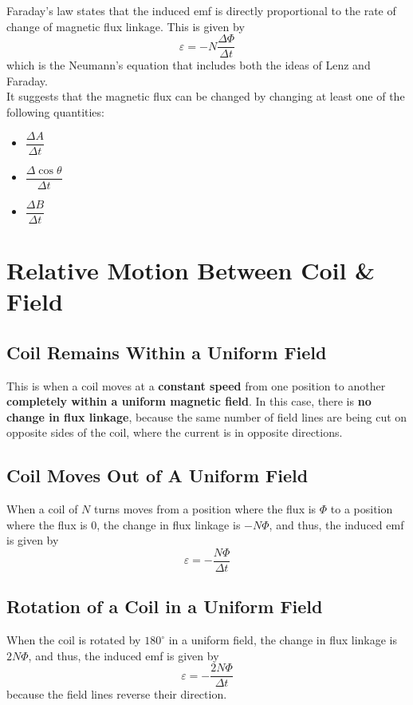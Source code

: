 \documentclass[a4paper,12pt]{article}
\let\oldsection\section
\renewcommand\section{\clearpage\oldsection}
\newcommand{\degsym}{^{\circ}}
\newcommand{\lb}{\\[8pt]}
\begin{document}
Faraday's law states that the induced emf is directly proportional to the rate of change of magnetic flux linkage. This is given by $$\varepsilon = -N\frac{\Delta \Phi}{\Delta t}$$
which is the Neumann's equation that includes both the ideas of Lenz and Faraday.\lb
It suggests that the magnetic flux can be changed by changing at least one of the following quantities:
\begin{itemize}
  \item $\dfrac{\Delta A}{\Delta t}$
  \item $\dfrac{\Delta \cos \theta}{\Delta t}$
  \item $\dfrac{\Delta B}{\Delta t}$
\end{itemize}

\section{Relative Motion Between Coil \& Field}

\subsection{Coil Remains Within a Uniform Field}

This is when a coil moves at a \textbf{constant speed} from one position to another \textbf{completely within a uniform magnetic field}. In this case, there is \textbf{no change in flux linkage}, because the same number of field lines are being cut on opposite sides of the coil, where the current is in opposite directions.

\subsection{Coil Moves Out of A Uniform Field}

When a coil of $N$ turns moves from a position where the flux is $\Phi$ to a position where the flux is 0, the change in flux linkage is $-N\Phi$, and thus, the induced emf is given by $$\varepsilon = -\frac{N\Phi}{\Delta t}$$

\subsection{Rotation of a Coil in a Uniform Field}

When the coil is rotated by $180\degsym$ in a uniform field, the change in flux linkage is $2N\Phi$, and thus, the induced emf is given by $$\varepsilon = -\frac{2N\Phi}{\Delta t}$$because the field lines reverse their direction.
\end{document}
